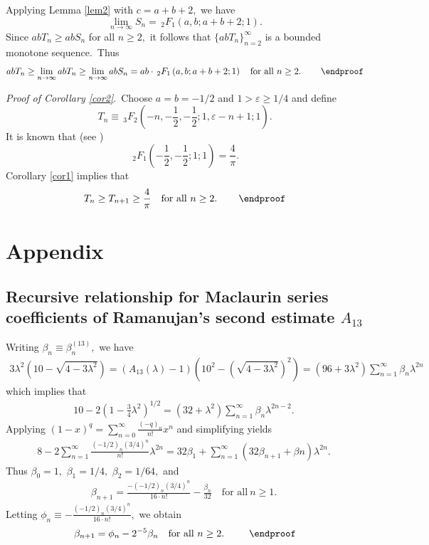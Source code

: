 \documentclass[final,oneeqnum]{siamltex}
\begin{document}
\noindent  Applying Lemma \ref{lem2} with $c=a+b+2,$ we have
\[
\lim_{n\rightarrow\infty} S_{n} = \,_{2}F_{1}\left(a,b;a+b+2;1\right).
\]
Since $a b T_{n} \geq a b S_{n}$ for all $n\geq
2,$ it follows that  $\{a b T_{n}\}_{n=2}^{\infty}$ is a bounded monotone
 sequence.\  Thus
\[
a b T_{n}\geq \lim_{n\rightarrow\infty} abT_{n} \geq
\lim_{n\rightarrow\infty} a b S_{n} = a
b\cdot\,_{2}F_{1}\left(a,b;a+b+2;1\right)
\quad \mbox{for all } n\geq 2.\, \qquad\endproof\]%

{\it Proof of Corollary {\rm\ref{cor2}}}.\ Choose $a=b=-1/2$ and $1>\varepsilon
\geq 1/4$
 and  define
\[
T_{n}\equiv  \,_{3}F_{2}\left(-n,-\frac{1}{2},-\frac{1}{2};1,\varepsilon
-n +1;1\right).
\]
It is known   that (see
\cite[p. 49]{R})
 \[
\,_{2}F_{1}\left(-\frac{1}{2},-\frac{1}{2};1;1\right) = \frac{4}{\pi}.
\]
Corollary \ref{cor1} implies that
\[
T_{n} \geq  T_{n+1} \geq \frac{4}{\pi} \quad \mbox{for all } n\geq 2.\,\qquad\endproof\]

\section{Appendix}

\subsection{Recursive relationship for  Maclaurin series
coefficients of Ramanujan's second estimate \protect\boldmath$A_{13}$}
Writing $\beta_{n}\equiv \beta^{(13)}_{n} ,$  we have
\begin{eqnarray} 
3\lambda^2(10-\sqrt{4-3\lambda^2})=(A_{13}(\lambda) -
1)(10^2 -(\sqrt{4-3\lambda^2})^2)=
 (96+3\lambda^2)\sum_{n=1}^{\infty}\beta_{n}\lambda^{2n} \nonumber
\end{eqnarray} 
which implies that
\begin{eqnarray} 
10-2\left(1-\frac{3}{4}\lambda^2\right)^{1/2}= (32
+\lambda^2)\sum_{n=1}^{\infty}\beta_{n}\lambda^{2n-2}.\ \nonumber
\end{eqnarray}
 Applying
$(1-x)^{q} = \sum_{n=0}^{\infty}\frac{(-q)_{n}}{n!}x^{n}$
and simplifying yields
\begin{eqnarray} 8
-2\sum_{n=1}^{\infty}\frac{(-1/2)_{n}(3/4)^n}{n!}\lambda^{2n} = 32\beta_{1}
+
\sum_{n=1}^{\infty}(32\beta_{n+1}+\beta{n})\lambda^{2n}.\  \nonumber
\end{eqnarray} 
Thus  $\beta_{0}=1,$ $\beta_{1}=1/4,$ $\beta_{2}=1/64,$ and
\begin{eqnarray}
\beta_{n+1} =   \frac{-(-1/2)_{n}(3/4)^n}{16\cdot n!}
-\frac{\beta_{n}}{32} \quad \mbox{for all} \ n\geq 1.\ \nonumber
\end{eqnarray} 
Letting $\displaystyle \phi_{n} \equiv   -
\frac{(-1/2)_{n}(3/4)^n}{16\cdot n!},$ we obtain
\begin{eqnarray}
\beta_{n+1} = \phi_{n} - 2^{-5}\beta_{n} \quad \mbox{for all } n\geq 2.\ \nonumber \,\qquad\endproof
\end{eqnarray}
\end{document}
